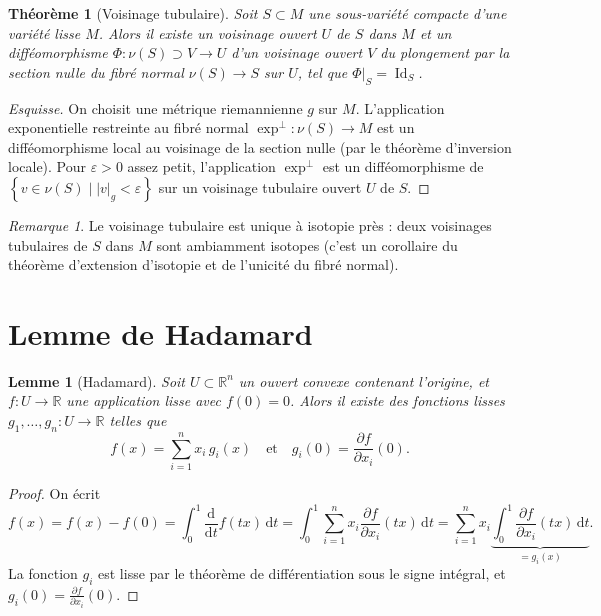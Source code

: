 \documentclass[12pt,a4paper,openany]{book}
\theoremstyle{definition}
\theoremstyle{plain}
\newtheorem{theoreme}[definition]{Théorème}
\newtheorem{lemme}[definition]{Lemme}
\theoremstyle{remark}
\newtheorem{remarque}[definition]{Remarque}
\newcommand{\R}{\mathbb{R}}
\DeclareMathOperator{\Id}{Id}
\newcommand{\dd}{\mathrm{d}}
\newcommand{\abs}[1]{\left|#1\right|}
\newcommand{\set}[1]{\left\{#1\right\}}
\begin{document}
\begin{theoreme}[Voisinage tubulaire]\label{thm:app-tubulaire}
Soit $S \subset M$ une sous-variété compacte d'une variété lisse $M$. Alors
il existe un voisinage ouvert $U$ de $S$ dans $M$ et un difféomorphisme
$\Phi : \nu(S) \supset V \to U$ d'un voisinage ouvert $V$ du plongement par la
section nulle du fibré normal $\nu(S) \to S$ sur $U$, tel que
$\Phi|_S = \Id_S$.
\end{theoreme}

\begin{proof}[Esquisse]
On choisit une métrique riemannienne $g$ sur $M$. L'application exponentielle
restreinte au fibré normal $\exp^\perp : \nu(S) \to M$ est un difféomorphisme
local au voisinage de la section nulle (par le théorème d'inversion locale). Pour
$\varepsilon > 0$ assez petit, l'application $\exp^\perp$ est un difféomorphisme
de $\set{v \in \nu(S) \mid \abs{v}_g < \varepsilon}$ sur un voisinage tubulaire
ouvert $U$ de $S$.
\end{proof}

\begin{remarque}
Le voisinage tubulaire est unique à isotopie près : deux voisinages tubulaires
de $S$ dans $M$ sont ambiamment isotopes (c'est un corollaire du théorème
d'extension d'isotopie et de l'unicité du fibré normal).
\end{remarque}

\section{Lemme de Hadamard}\label{app:hadamard}

\begin{lemme}[Hadamard]\label{lem:app-hadamard}
Soit $U \subset \R^n$ un ouvert convexe contenant l'origine, et
$f : U \to \R$ une application lisse avec $f(0) = 0$. Alors il existe des
fonctions lisses $g_1, \ldots, g_n : U \to \R$ telles que
\[
  f(x) = \sum_{i=1}^n x_i \, g_i(x) \quad \text{et} \quad
  g_i(0) = \frac{\partial f}{\partial x_i}(0).
\]
\end{lemme}

\begin{proof}
On écrit
\[
  f(x) = f(x) - f(0) = \int_0^1 \frac{\dd}{\dd t} f(tx) \, \dd t
  = \int_0^1 \sum_{i=1}^n x_i \frac{\partial f}{\partial x_i}(tx) \, \dd t
  = \sum_{i=1}^n x_i \underbrace{\int_0^1 \frac{\partial f}{\partial x_i}(tx) \, \dd t}_{= g_i(x)}.
\]
La fonction $g_i$ est lisse par le théorème de différentiation sous le signe
intégral, et $g_i(0) = \frac{\partial f}{\partial x_i}(0)$.
\end{proof}
\end{document}
